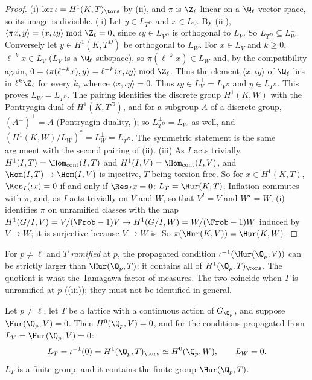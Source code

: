 \begin{proof}
(i) $\ker\iota=H^1(K,T)_{\tors}$ by (ii), and $\pi$ is $\Z_\ell$-linear on a $\Q_\ell$-vector space, so its image is divisible.
(ii) Let $y\in L_{T^D}$ and $x\in L_V$. By (iii), $\langle\pi x,y\rangle=\langle x,\iota y\rangle\bmod\Z_\ell=0$, since $\iota y\in L_{V^D}$ is orthogonal
to $L_V$. So $L_{T^D}\subseteq L_W^\perp$. Conversely let $y\in H^1(K,T^D)$ be orthogonal to $L_W$. For $x\in L_V$ and $k\ge0$, $\ell^{-k}x\in L_V$ ($L_V$ is a
$\Q_\ell$-subspace), so $\pi(\ell^{-k}x)\in L_W$ and, by the compatibility again, $0=\langle\pi(\ell^{-k}x),y\rangle=\ell^{-k}\langle x,\iota y\rangle\bmod\Z_\ell$. Thus the element
$\langle x,\iota y\rangle$ of $\Q_\ell$ lies in $\ell^k\Z_\ell$ for every $k$, whence $\langle x,\iota y\rangle=0$. Thus $\iota y\in L_V^\perp=L_{V^D}$ and $y\in L_{T^D}$. This proves
$L_W^\perp=L_{T^D}$. The pairing identifies the discrete group $H^1(K,W)$ with the Pontryagin dual of $H^1(K,T^D)$, and for a subgroup $A$ of a discrete group,
$(A^\perp)^\perp=A$ (Pontryagin duality, ); so $L_{T^D}^\perp=L_W$ as well, and $(H^1(K,W)/L_W)^*=L_W^\perp=L_{T^D}$. The symmetric statement is the same
argument with the second pairing of (ii).
(iii) As $I$ acts trivially, $H^1(I,T)=\Hom_{\mathrm{cont}}(I,T)$ and $H^1(I,V)=\Hom_{\mathrm{cont}}(I,V)$, and $\Hom(I,T)\to\Hom(I,V)$ is injective, $T$ being torsion-free. So
for $x\in H^1(K,T)$, $\Res_I(\iota x)=0$ if and only if $\Res_Ix=0$: $L_T=\Hur(K,T)$. Inflation commutes with $\pi$, and, as $I$ acts trivially on $V$ and $W$, so that
$V^I=V$ and $W^I=W$, (i) identifies $\pi$ on unramified classes with the map $H^1(G/I,V)=V/(\Frob-1)V\to
H^1(G/I,W)=W/(\Frob-1)W$ induced by $V\to W$; it is surjective because $V\to W$ is. So $\pi(\Hur(K,V))=\Hur(K,W)$.
\end{proof}

\begin{warning}
For $p\ne\ell$ and $T$ \emph{ramified} at $p$, the propagated condition $\iota^{-1}(\Hur(\Q_p,V))$ can be strictly larger than $\Hur(\Q_p,T)$: it contains all of
$H^1(\Q_p,T)_{\tors}$. The quotient is what the Tamagawa factor of  measures. The two coincide when $T$ is unramified at $p$
((iii)); they must not be identified in general.
\end{warning}

\begin{corollary}\label{cor:galcoh:ur-vanishing}
Let $p\ne\ell$, let $T$ be a lattice with a continuous action of $G_{\Q_p}$, and suppose $\Hur(\Q_p,V)=0$. Then $H^0(\Q_p,V)=0$, and for the conditions propagated from
$L_V=\Hur(\Q_p,V)=0$:
\[
L_T=\iota^{-1}(0)=H^1(\Q_p,T)_{\tors}\simeq H^0(\Q_p,W),\qquad L_W=0 .
\]
$L_T$ is a finite group, and it contains the finite group $\Hur(\Q_p,T)$.
\end{corollary}

